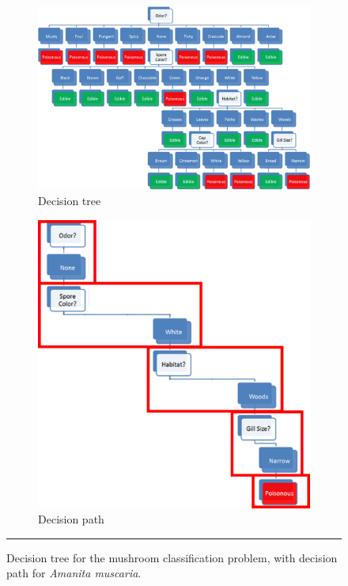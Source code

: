 \begin{figure}[!t]
\begin{subfigure}[b]{0.57\textwidth}
\includegraphics[height=0.3\textheight]{images/DSML/mushroom1.png}\caption{\small Decision tree} \label{fig:DT_mushroom1}
\end{subfigure}\qquad
\begin{subfigure}[b]{0.3\textwidth}
\includegraphics[height=0.3\textheight]{images/DSML/mushroom2.png}\caption{\small Decision path} \label{fig:DT_mushroom2}
\end{subfigure}
\caption[\small Decision tree for the mushroom classification problem]{\small Decision tree for the mushroom classification problem, with decision path for \textit{Amanita muscaria}.}\label{fig:DT_mushroom}\hrule
\end{figure}\afterpage{\FloatBarrier}
